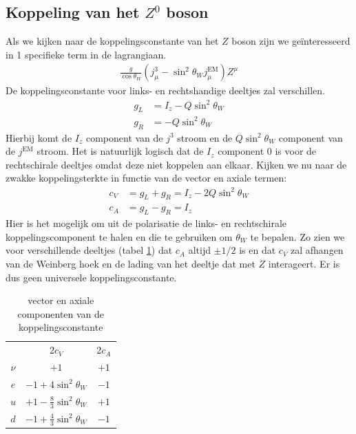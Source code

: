 \documentclass[../main.tex]{subfiles}
\begin{document}
\subsection{Koppeling van het $Z^0$ boson}%
\label{sub:koppeling_van_het_z_0_boson}

Als we kijken naar de koppelingsconstante van het $Z$ boson zijn we geïnteresseerd in 1 specifieke term in de lagrangiaan.
\begin{equation}
    \begin{aligned}
        \label{eq:z_term_lagrangiaan}
        \frac{g}{\cos\theta_W} (j_\mu^3 - \sin^2\theta_Wj_\mu^\text{EM})Z^\mu
    \end{aligned}
\end{equation}
De koppelingsconstante voor links- en rechtshandige deeltjes zal verschillen.
\begin{equation}
    \begin{aligned}
        \label{eq:z_koppelingsterkte}
        g_L &= I_z - Q\sin^2\theta_W\\
        g_R &= -Q\sin^2\theta_W
    \end{aligned}
\end{equation}
Hierbij komt de $I_z$ component van de $j^3$ stroom en de $Q\sin^2\theta_W$ component van de $j^\text{EM}$ stroom. Het is natuurlijk logisch dat de $I_z$ component 0 is voor de rechtschirale deeltjes omdat deze niet koppelen aan elkaar. Kijken we nu naar de zwakke koppelingsterkte in functie van de vector en axiale termen:
\begin{equation}
    \begin{aligned}
        \label{eq:zwakke_koppelingsconstante}
        c_V &= g_L + g_R = I_z - 2Q\sin^2\theta_W\\
        c_A &= g_L - g_R = I_z
    \end{aligned}
\end{equation}
Hier is het mogelijk om uit de polarisatie de links- en rechtschirale koppelingscomponent te halen en die te gebruiken om $\theta_W$ te bepalen. Zo zien we voor verschillende deeltjes (tabel \ref{tab:v_a_comp_kc}) dat $c_A$ altijd $\pm1/2$ is en dat $c_V$ zal afhangen van de Weinberg hoek en de lading van het deeltje dat met $Z$ interageert. Er is dus geen universele koppelingsconstante.

\begin{table}[h]
    \centering
    \caption{vector en axiale componenten van de koppelingsconstante}
    \label{tab:v_a_comp_kc}
    \begin{tabular}{ccc}
                & $2c_V$                            & $2c_A$    \\
        $\nu$   & $+1$                              & $+1$      \\
        $e$     & $-1+4\sin^2\theta_W$              & $-1$      \\
        $u$     & $+1-\frac{8}{3}\sin^2\theta_W$    & $+1$      \\
        $d$     & $-1+\frac{4}{3}\sin^2\theta_W$    & $-1$      \\
    \end{tabular}
\end{table}
\end{document}
